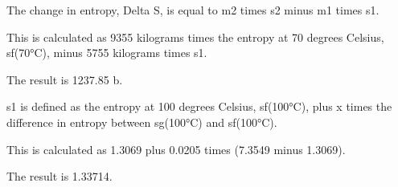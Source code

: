 The change in entropy, Delta S, is equal to m2 times s2 minus m1 times s1.

This is calculated as 9355 kilograms times the entropy at 70 degrees Celsius, sf(70°C), minus 5755 kilograms times s1.

The result is 1237.85 b.

s1 is defined as the entropy at 100 degrees Celsius, sf(100°C), plus x times the difference in entropy between sg(100°C) and sf(100°C).

This is calculated as 1.3069 plus 0.0205 times (7.3549 minus 1.3069).

The result is 1.33714.